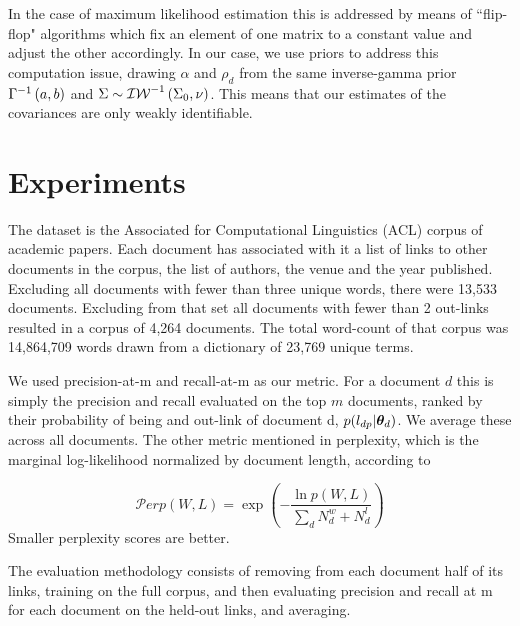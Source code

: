 In the case of maximum likelihood estimation this is addressed by means of ``flip-flop" algorithms\cite{Srivastava2009} which fix an element of one matrix to a constant value and adjust the other accordingly. In our case, we use priors to address this computation issue, drawing $\alpha$ and $\rho_d$ from the same inverse-gamma prior ${\Gamma}^{-1}\left(a, b\right)$ and $\Sigma \sim {\mathcal{IW}}^{-1}\left(\Sigma_0, \nu\right)$. This means that our estimates of the covariances are only weakly identifiable.




\section{Experiments}
The dataset is the Associated for Computational Linguistics (ACL) corpus of academic papers. Each document has associated with it a list of links to other documents in the corpus, the list of authors, the venue and the year published. Excluding all documents with fewer than three unique words, there were 13,533 documents. Excluding from that set all documents with fewer than 2 out-links resulted in a corpus of 4,264 documents. The total word-count of that corpus was 14,864,709 words drawn from a dictionary of 23,769 unique terms.

We used precision-at-m and recall-at-m as our metric. For a document $d$ this is simply the precision and recall evaluated on the top $m$ documents, ranked by their probability of being and out-link of document d, $p(l_{dp} | { \bm \theta_d })$. We average these across all documents. The other metric mentioned in perplexity, which is the marginal log-likelihood normalized by document length, according to 

\begin{equation}
\mathcal{P}erp(W,L) = \exp\left( - \frac{\ln p(W,L)}{\sum_d N^w_d + N^l_d} \right)
\end{equation}
Smaller perplexity scores are better.

The evaluation methodology consists of removing from each document half of its links, training on the full corpus, and then evaluating precision and recall at m for each document on the held-out links, and averaging.

